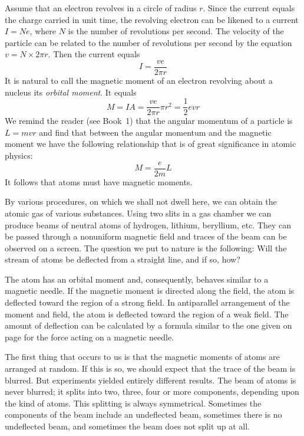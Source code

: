 Assume that an electron revolves in a circle of radius $r$. Since the current equals the charge carried in unit time, the revolving electron can be likened to a current $I=Ne$, where $N$ is the number of revolutions per second. The velocity of the particle can be related to the number of revolutions per second by the equation $v=N \times 2 \pi r$. Then the current equals
\begin{equation*}%
I = \frac{ve}{2 \pi r}
\end{equation*}
It is natural to call the magnetic moment of an electron revolving about a nucleus its \emph{orbital moment}. It equals
\begin{equation*}%
M = IA = \frac{ve}{2 \pi r} \pi r^{2} = \frac{1}{2} evr
\end{equation*}
We remind the reader (see Book~1) that the angular momentum of a particle is $L=mvr$ and find that between the angular momentum and the magnetic moment we have the following relationship that is of great significance in atomic physics:
\begin{equation*}%
M = \frac{e}{2m} L
\end{equation*}
It follows that atoms must have magnetic moments.

By various procedures, on which we shall not dwell here, we can obtain the atomic gas of various substances. Using two slits in a gas chamber we can produce beams of neutral atoms of hydrogen, lithium, beryllium, etc. They can be passed through a nonuniform magnetic field and traces of the beam can be observed on a screen. The question we put to nature is the following: Will the stream of atoms be deflected from a straight line, and if so, how?

The atom has an orbital moment and, consequently, behaves similar to a magnetic needle. If the magnetic moment is directed along the field, the atom is deflected toward the region of a strong field. In antiparallel arrangement of the moment and field, the atom is deflected toward the region of a weak field. The amount of deflection can be calculated by a formula similar to the one given on page \pageref{force-mag} for the force acting on a magnetic needle.

The first thing that occurs to us is that the magnetic moments of atoms are arranged at random. If this is so, we should expect that the trace of the beam is blurred. But experiments yielded entirely different results. The beam of atoms is never blurred; it splits into two, three, four or more components, depending upon the kind of atoms. This splitting is always symmetrical. Sometimes the components of the beam include an undeflected beam, sometimes there is no undeflected beam, and sometimes the beam does not split up at all.

